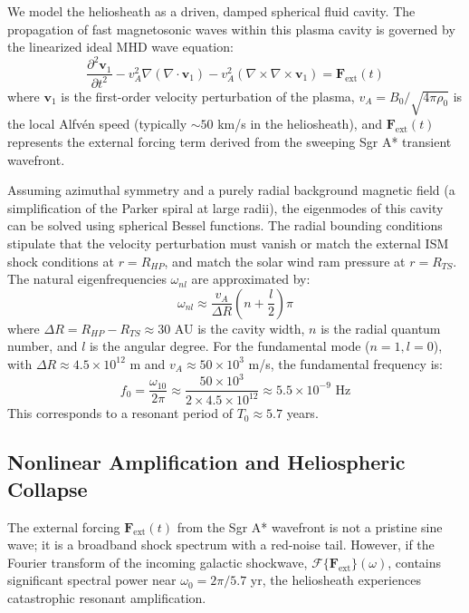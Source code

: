 \documentclass[12pt,a4paper]{article}
\begin{document}
We model the heliosheath as a driven, damped spherical fluid cavity. The propagation of fast magnetosonic waves within this plasma cavity is governed by the linearized ideal MHD wave equation:
\begin{equation}
    \frac{\partial^2 \mathbf{v}_1}{\partial t^2} - v_A^2 \nabla (\nabla \cdot \mathbf{v}_1) - v_A^2 (\nabla \times \nabla \times \mathbf{v}_1) = \mathbf{F}_{\text{ext}}(t)
\end{equation}
where $\mathbf{v}_1$ is the first-order velocity perturbation of the plasma, $v_A = B_0 / \sqrt{4\pi \rho_0}$ is the local Alfvén speed (typically $\sim 50$ km/s in the heliosheath), and $\mathbf{F}_{\text{ext}}(t)$ represents the external forcing term derived from the sweeping Sgr A* transient wavefront.

Assuming azimuthal symmetry and a purely radial background magnetic field (a simplification of the Parker spiral at large radii), the eigenmodes of this cavity can be solved using spherical Bessel functions. The radial bounding conditions stipulate that the velocity perturbation must vanish or match the external ISM shock conditions at $r = R_{HP}$, and match the solar wind ram pressure at $r = R_{TS}$. The natural eigenfrequencies $\omega_{nl}$ are approximated by:
\begin{equation}
    \omega_{nl} \approx \frac{v_A}{\Delta R} \left( n + \frac{l}{2} \right) \pi
\end{equation}
where $\Delta R = R_{HP} - R_{TS} \approx 30$ AU is the cavity width, $n$ is the radial quantum number, and $l$ is the angular degree. For the fundamental mode ($n=1, l=0$), with $\Delta R \approx 4.5 \times 10^{12}$ m and $v_A \approx 50 \times 10^3$ m/s, the fundamental frequency is:
\begin{equation}
    f_0 = \frac{\omega_{10}}{2\pi} \approx \frac{50 \times 10^3}{2 \times 4.5 \times 10^{12}} \approx 5.5 \times 10^{-9} \text{ Hz}
\end{equation}
This corresponds to a resonant period of $T_0 \approx 5.7$ years. 

\subsection{Nonlinear Amplification and Heliospheric Collapse}

The external forcing $\mathbf{F}_{\text{ext}}(t)$ from the Sgr A* wavefront is not a pristine sine wave; it is a broadband shock spectrum with a red-noise tail. However, if the Fourier transform of the incoming galactic shockwave, $\mathcal{F}\{\mathbf{F}_{\text{ext}}\}(\omega)$, contains significant spectral power near $\omega_0 = 2\pi / 5.7$ yr, the heliosheath experiences catastrophic resonant amplification.
\end{document}
